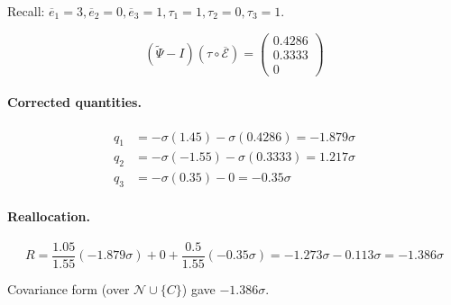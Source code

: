 \documentclass[11pt]{article}
\newcommand{\N}{\mathcal{N}}
\begin{document}
Recall: $\overline{e}_1 = 3, \overline{e}_2 = 0, \overline{e}_3 = 1, \tau_1 = 1, \tau_2 = 0, \tau_3 = 1$.

$$(\widetilde{\Psi} - I)(\tau \circ \overline{\mathcal{E}}) = \begin{pmatrix} 0.4286 \\ 0.3333 \\ 0 \end{pmatrix}$$

\paragraph{Corrected quantities.}
\begin{align*}
    q_1 &= -\sigma(1.45) - \sigma(0.4286) = -1.879\sigma \\
    q_2 &= -\sigma(-1.55) - \sigma(0.3333) = 1.217\sigma \\
    q_3 &= -\sigma(0.35) - 0 = -0.35\sigma
\end{align*}

\paragraph{Reallocation.}
$$R = \frac{1.05}{1.55}(-1.879\sigma) + 0 + \frac{0.5}{1.55}(-0.35\sigma) = -1.273\sigma - 0.113\sigma = -1.386\sigma$$

Covariance form (over $\N \cup \{C\}$) gave $-1.386\sigma$. \checkmark
\end{document}
